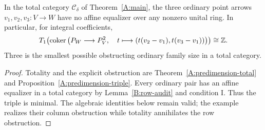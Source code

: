 \begin{corollary}\label{B:triple-question}
In the total category $\mathcal C_\delta$ of Theorem~\ref{A:main},
the three ordinary point arrows $v_1,v_2,v_3:V\to W$ have no
affine equalizer over any nonzero unital ring. In particular, for
integral coefficients,
\[
 T_1\!\left(\operatorname{coker}
  \left(P_W\longrightarrow P_V^2,\quad
   t\longmapsto(t(v_2-v_1),t(v_3-v_1))\right)\right)\cong\mathbb Z.
\]
Three is the smallest possible obstructing ordinary family size
in a total category.
\end{corollary}
\begin{proof}
Totality and the explicit obstruction are
Theorem~\ref{A:predimension-total} and
Proposition~\ref{A:predimension-triple}. Every ordinary pair has
an affine equalizer in a total category by
Lemma~\ref{B:row-audit} and condition I. Thus the triple is minimal.
The algebraic identities below remain valid; the example realizes
their column obstruction while totality annihilates the row
obstruction.
\end{proof}
